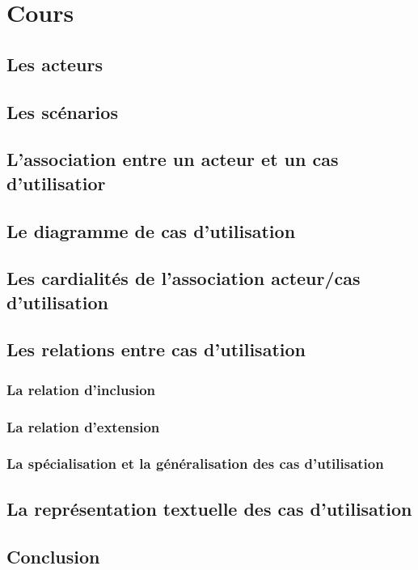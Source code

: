 \section{Cours}

\subsection{Les acteurs}

\subsection{Les scénarios}

\subsection{L'association entre un acteur et un cas d'utilisatior}

\subsection{Le diagramme de cas d'utilisation}

\subsection{Les cardialités de l'association acteur/cas d'utilisation}

\subsection{Les relations entre cas d'utilisation}

\subsubsection{La relation d'inclusion}

\subsubsection{La relation d'extension}

\subsubsection{La spécialisation et la généralisation des cas d'utilisation}

\subsection{La représentation textuelle des cas d'utilisation}

\subsection{Conclusion}
